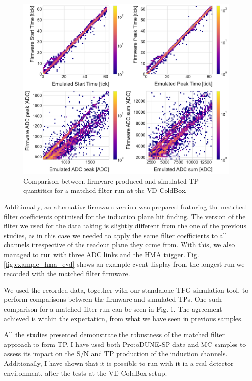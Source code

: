 \begin{figure}[t]
    \centering
    \includegraphics[scale = 0.5]{Images/Matched_Filter/np02_coldbox_tp_comp.pdf}
    \caption[Comparison between firmware-produced and simulated TP quantities for a matched filter run at the VD ColdBox.]{Comparison between firmware-produced and simulated TP quantities for a matched filter run at the VD ColdBox.}
    \label{fig:vdcoldbox_tp_comp}
\end{figure}

Additionally, an alternative firmware version was prepared featuring the matched filter coefficients optimised for the induction plane hit finding. The version of the filter we used for the data taking is slightly different from the one of the previous studies, as in this case we needed to apply the same filter coefficients to all channels irrespective of the readout plane they come from. With this, we also managed to run with three ADC links and the HMA trigger. Fig. \ref{fig:example_hma_evd} shows an example event display from the longest run we recorded with the matched filter firmware.

We used the recorded data, together with our standalone TPG simulation tool, to perform comparisons between the firmware and simulated TPs. One such comparison for a matched filter run can be seen in Fig. \ref{fig:vdcoldbox_tp_comp}. The agreement achieved is within the expectation, from what we have seen in previous samples.

All the studies presented demonstrate the robustness of the matched filter approach to form TP. I have used both ProtoDUNE-SP data and MC samples to assess its impact on the S/N and TP production of the induction channels. Additionally, I have shown that it is possible to run with it in a real detector environment, after the tests at the VD ColdBox setup.